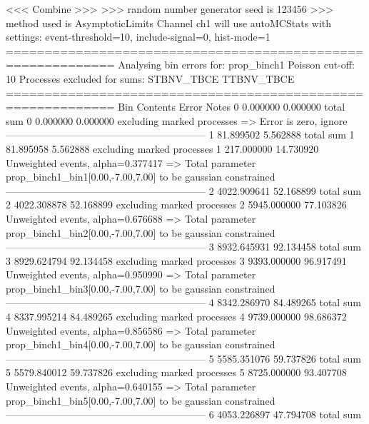  <<< Combine >>> 
>>> random number generator seed is 123456
>>> method used is AsymptoticLimits
Channel ch1 will use autoMCStats with settings: event-threshold=10, include-signal=0, hist-mode=1
============================================================
Analysing bin errors for: prop_binch1
Poisson cut-off: 10
Processes excluded for sums: STBNV_TBCE TTBNV_TBCE
============================================================
Bin        Contents        Error           Notes                         
0          0.000000        0.000000        total sum                     
0          0.000000        0.000000        excluding marked processes    
  => Error is zero, ignore      
------------------------------------------------------------
1          81.899502       5.562888        total sum                     
1          81.895958       5.562888        excluding marked processes    
1          217.000000      14.730920       Unweighted events, alpha=0.377417
  => Total parameter prop_binch1_bin1[0.00,-7.00,7.00] to be gaussian constrained
------------------------------------------------------------
2          4022.909641     52.168899       total sum                     
2          4022.308878     52.168899       excluding marked processes    
2          5945.000000     77.103826       Unweighted events, alpha=0.676688
  => Total parameter prop_binch1_bin2[0.00,-7.00,7.00] to be gaussian constrained
------------------------------------------------------------
3          8932.645931     92.134458       total sum                     
3          8929.624794     92.134458       excluding marked processes    
3          9393.000000     96.917491       Unweighted events, alpha=0.950990
  => Total parameter prop_binch1_bin3[0.00,-7.00,7.00] to be gaussian constrained
------------------------------------------------------------
4          8342.286970     84.489265       total sum                     
4          8337.995214     84.489265       excluding marked processes    
4          9739.000000     98.686372       Unweighted events, alpha=0.856586
  => Total parameter prop_binch1_bin4[0.00,-7.00,7.00] to be gaussian constrained
------------------------------------------------------------
5          5585.351076     59.737826       total sum                     
5          5579.840012     59.737826       excluding marked processes    
5          8725.000000     93.407708       Unweighted events, alpha=0.640155
  => Total parameter prop_binch1_bin5[0.00,-7.00,7.00] to be gaussian constrained
------------------------------------------------------------
6          4053.226897     47.794708       total sum                     
